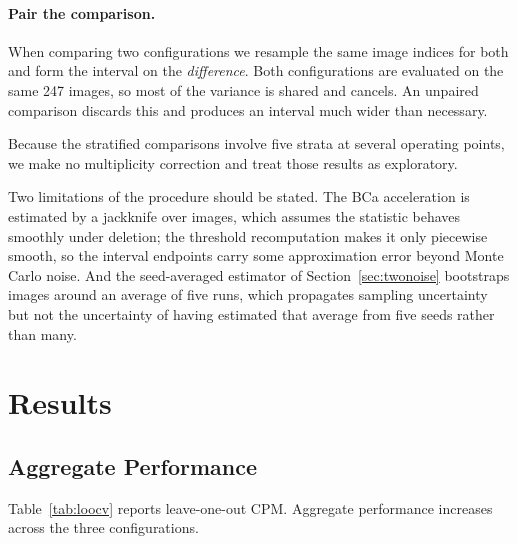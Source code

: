 \documentclass[11pt,a4paper]{article}
\begin{document}
\paragraph{Pair the comparison.}
When comparing two configurations we resample the same image indices for both
and form the interval on the \emph{difference}. Both configurations are
evaluated on the same 247 images, so most of the variance is shared and
cancels. An unpaired comparison discards this and produces an interval much
wider than necessary.

Because the stratified comparisons involve five strata at several operating
points, we make no multiplicity correction and treat those results as
exploratory.

Two limitations of the procedure should be stated. The BCa acceleration is
estimated by a jackknife over images, which assumes the statistic behaves
smoothly under deletion; the threshold recomputation makes it only piecewise
smooth, so the interval endpoints carry some approximation error beyond Monte
Carlo noise. And the seed-averaged estimator of Section~\ref{sec:twonoise}
bootstraps images around an average of five runs, which propagates sampling
uncertainty but not the uncertainty of having estimated that average from five
seeds rather than many.

\section{Results}

\subsection{Aggregate Performance}

Table~\ref{tab:loocv} reports leave-one-out CPM. Aggregate performance
increases across the three configurations.
\end{document}
